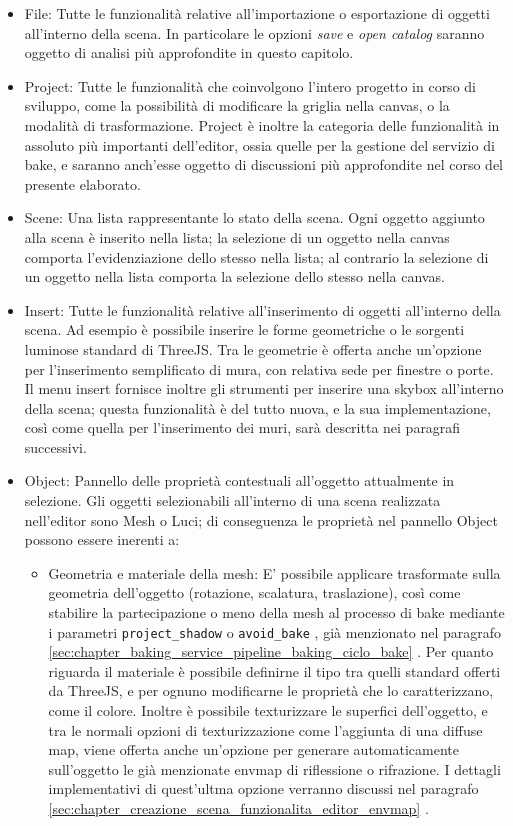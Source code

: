 \begin{itemize}
\item File: Tutte le funzionalità relative all’importazione o esportazione di oggetti all’interno della scena. In particolare le opzioni \emph{save} e \emph{open catalog} saranno oggetto di analisi più approfondite in questo capitolo.
\item Project: Tutte le funzionalità che coinvolgono l’intero progetto in corso di sviluppo, come la possibilità di modificare la griglia nella canvas, o la modalità di trasformazione. Project è inoltre la categoria delle funzionalità in assoluto più importanti dell’editor, ossia quelle per la gestione del servizio di bake, e saranno anch’esse oggetto di discussioni più approfondite nel corso del presente elaborato.
\item Scene: Una lista rappresentante lo stato della scena. Ogni oggetto aggiunto alla scena è inserito nella lista; la selezione di un oggetto nella canvas comporta l’evidenziazione dello stesso nella lista; al contrario la selezione di un oggetto nella lista comporta la selezione dello stesso nella canvas. 
\item Insert: Tutte le funzionalità relative all’inserimento di oggetti all’interno della scena. Ad esempio è possibile inserire le forme geometriche o le sorgenti luminose standard di ThreeJS. Tra le geometrie è offerta anche un’opzione per l’inserimento semplificato di mura, con relativa sede per finestre o porte.
\\
Il menu insert fornisce inoltre gli strumenti per inserire una skybox all’interno della scena; questa funzionalità è del tutto nuova, e la sua implementazione, così come quella per l’inserimento dei muri, sarà descritta nei paragrafi successivi.
\item Object: Pannello delle proprietà contestuali all’oggetto attualmente in selezione. Gli oggetti selezionabili all’interno di una scena realizzata nell’editor sono Mesh o Luci; di conseguenza le proprietà nel pannello Object possono essere inerenti a:
\begin{itemize}
\item Geometria e materiale della mesh: E’ possibile applicare trasformate sulla geometria dell’oggetto (rotazione, scalatura, traslazione), così come stabilire la partecipazione o meno della mesh al processo di bake mediante i parametri \texttt{project\_shadow} o \texttt{avoid\_bake} , già menzionato nel paragrafo \ref{sec:chapter_baking_service_pipeline_baking_ciclo_bake} . Per quanto riguarda il materiale è possibile definirne il tipo tra quelli standard offerti da ThreeJS, e per ognuno modificarne le proprietà che lo caratterizzano, come il colore. Inoltre è possibile texturizzare le superfici dell’oggetto, e tra le normali opzioni di texturizzazione come l’aggiunta di una diffuse map, viene offerta anche un’opzione per generare automaticamente sull’oggetto le già menzionate envmap di riflessione o rifrazione. I dettagli implementativi di quest’ultma opzione verranno discussi nel paragrafo \ref{sec:chapter_creazione_scena_funzionalita_editor_envmap} .

\end{itemize}
\end{itemize}
